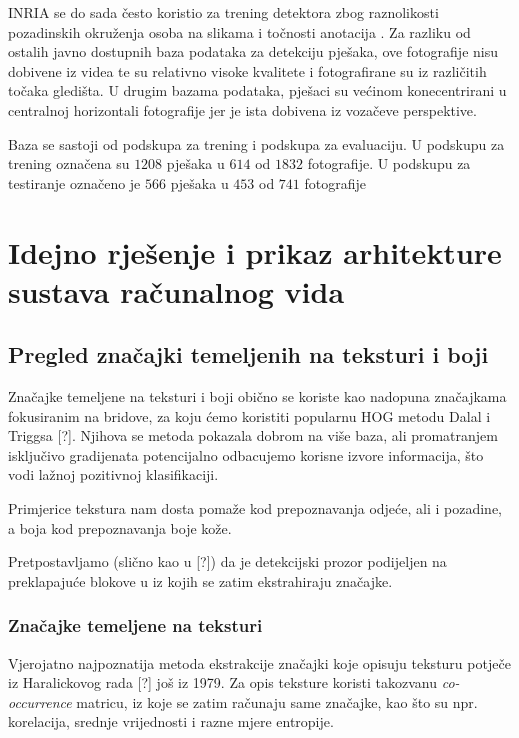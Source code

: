 \documentclass[seminar]{fer}
\begin{document}
INRIA se do sada često koristio za trening detektora zbog raznolikosti pozadinskih okruženja osoba na slikama i točnosti anotacija \cite{BenensonOHS14}. Za razliku od ostalih javno dostupnih baza podataka za detekciju pješaka, ove fotografije nisu dobivene iz videa te su relativno visoke kvalitete i fotografirane su iz različitih točaka gledišta. U drugim bazama podataka, pješaci su većinom konecentrirani u centralnoj horizontali fotografije jer je ista dobivena iz vozačeve perspektive.

Baza se sastoji od podskupa za trening i podskupa za evaluaciju. U podskupu za trening označena su $1208$ pješaka u $614$ od $1832$ fotografije. U podskupu za testiranje označeno je $566$ pješaka u $453$ od $741$ fotografije \cite{Dollar:2012:PDE:2197081.2197275}

\chapter{Idejno rješenje i prikaz arhitekture sustava računalnog vida}

\section{Pregled značajki temeljenih na teksturi i boji}

Značajke temeljene na teksturi i boji obično se koriste kao nadopuna značajkama fokusiranim na bridove, za koju ćemo koristiti popularnu HOG
metodu Dalal i Triggsa [?]. Njihova se metoda pokazala dobrom na više baza, ali promatranjem isključivo gradijenata potencijalno odbacujemo
korisne izvore informacija, što vodi lažnoj pozitivnoj klasifikaciji.

Primjerice tekstura nam dosta pomaže kod prepoznavanja odjeće, ali i pozadine, a boja kod prepoznavanja boje kože.


Pretpostavljamo (slično kao u [?]) da je detekcijski prozor podijeljen na preklapajuće blokove u iz kojih se zatim ekstrahiraju značajke.

\subsection{Značajke temeljene na teksturi}

Vjerojatno najpoznatija metoda ekstrakcije značajki koje opisuju teksturu potječe iz Haralickovog rada [?] još iz 1979. Za opis teksture koristi takozvanu \emph{co-occurrence} matricu, iz koje se zatim računaju same značajke, kao što su npr. korelacija, srednje vrijednosti i razne mjere entropije.
\end{document}

